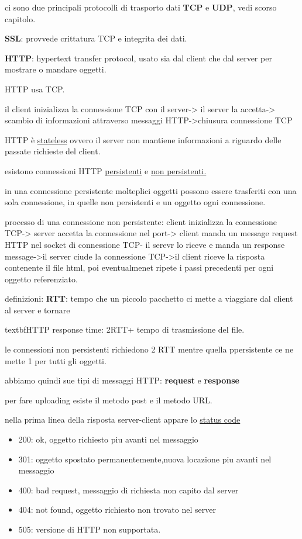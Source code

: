 \documentclass[12pt]{article}
\begin{document}
ci sono due principali protocolli di trasporto dati \textbf{TCP} e \textbf{UDP}, vedi scorso capitolo.


\textbf{SSL}: provvede crittatura TCP e integrita dei dati.


\textbf{HTTP}: hypertext transfer protocol, usato sia dal client che dal server per mostrare o mandare oggetti.

HTTP usa TCP.

il client inizializza la connessione TCP con il server-> il server la accetta-> scambio di informazioni attraverso messaggi HTTP->chiusura connessione TCP

HTTP è \underline{stateless} ovvero il server non mantiene informazioni a riguardo delle passate richieste del client.

esistono connessioni HTTP \underline{persistenti} e \underline{non persistenti.}

in una connessione persistente molteplici oggetti possono essere trasferiti con una sola connessione, in quelle non persistenti e un oggetto ogni connessione.


processo di una connessione non persistente: client inizializza la connessione TCP-> server accetta la connessione nel port-> client manda un message request HTTP nel socket di connessione TCP- il serevr lo riceve e manda un response message->il server ciude la connessione TCP->il client riceve la risposta contenente il file html, poi eventualmenet ripete i passi precedenti per ogni oggetto referenziato.

definizioni: \textbf{RTT}: tempo che un piccolo pacchetto  ci mette a viaggiare dal client al server e tornare

textbf{HTTP response time}: 2RTT+ tempo di trasmissione del file.


le connessioni non persistenti richiedono 2 RTT mentre quella ppersistente ce ne mette 1 per tutti gli oggetti.

abbiamo quindi sue tipi di messaggi HTTP: \textbf{request} e \textbf{response}

per fare uploading esiste il metodo post e il metodo URL.

nella prima linea della risposta server-client appare lo \underline{status code}

\begin{itemize}
\item 200: ok, oggetto richiesto piu avanti nel messaggio
\item 301: oggetto spostato permanentemente,nuova locazione piu avanti nel messaggio
\item 400: bad request, messaggio di richiesta non capito dal server
\item 404: not found, oggetto richiesto non trovato nel server
\item 505: versione di HTTP non supportata.
\end{itemize}
\end{document}
